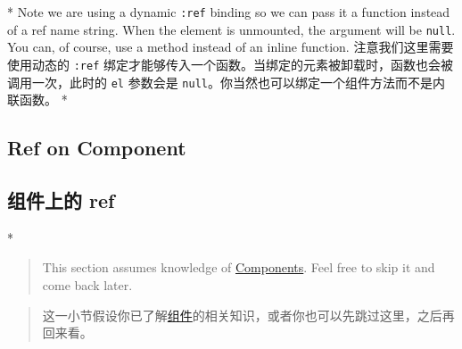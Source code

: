 \begin{paracol}{2}
\switchcolumn[0]*%
Note we are using a dynamic \texttt{:ref} binding so we can pass it a
function instead of a ref name string. When the element is unmounted,
the argument will be \texttt{null}. You can, of course, use a method
instead of an inline function.
\switchcolumn
注意我们这里需要使用动态的 \texttt{:ref}
绑定才能够传入一个函数。当绑定的元素被卸载时，函数也会被调用一次，此时的
\texttt{el} 参数会是
\texttt{null}。你当然也可以绑定一个组件方法而不是内联函数。
\switchcolumn[0]*%
\subsection{Ref on Component}
\switchcolumn
\subsection{组件上的 ref}
\switchcolumn[0]*%
\begin{quote}
This section assumes knowledge of
\href{https://vuejs.org/guide/essentials/component-basics.html}{Components}.
Feel free to skip it and come back later.
\end{quote}
\switchcolumn
\begin{quote}
这一小节假设你已了解\href{https://cn.vuejs.org/guide/essentials/component-basics.html}{组件}的相关知识，或者你也可以先跳过这里，之后再回来看。
\end{quote}



\end{paracol}
